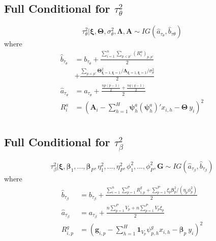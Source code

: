 \documentclass[
]{article}
\begin{document}
\subsection{\texorpdfstring{Full Conditional for \(\tau^2_\theta\)}{Full Conditional for \textbackslash tau\^{}2\_\textbackslash theta}}\label{full-conditional-for-tau2_theta}

\[ \tau^2_\theta| {\boldsymbol \xi} , {\boldsymbol \Theta} , \sigma_{\theta}^2,  {\boldsymbol \Lambda} ,  {\boldsymbol A} \sim IG(\hat{a}_{\tau_\theta}, \hat{b}_{\tau\theta}) \]
where
\begin{align*}
    \hat{b}_{\tau_\theta} & = b_{\tau_\theta} + \frac{\sum_{i=1}^n \sum_{p<p'} (R^a_i)_{p,p'}}{2} \\
    &+ \frac{\sum_{p<p'}  {\boldsymbol \Theta} _{ {\boldsymbol \xi} = 1,  {\boldsymbol \xi} = 1}^2 /  {\boldsymbol \Lambda} _{ {\boldsymbol \xi} = 1,  {\boldsymbol \xi} = 1} / \sigma^2_{\theta}}{2}  \\ 
    \hat{a}_{\tau_\theta} & = a_{\tau_\theta} + \frac{\frac{np(p-1)}{2} + \frac{nq(q-1)}{2}}{2} \\
    R_i^a                 &=  \left(  {\boldsymbol A} _i - \sum_{h=1}^{H}  {\boldsymbol \psi} _{h}^a ( {\boldsymbol \psi} _{h}^{a})' x_{i,h} -  {\boldsymbol \Theta} \: y_i \right)^2  \\
\end{align*}

\subsection{\texorpdfstring{Full Conditional for \(\tau^2_\beta\)}{Full Conditional for \textbackslash tau\^{}2\_\textbackslash beta}}\label{full-conditional-for-tau2_beta}

\[ \tau^2_\beta| {\boldsymbol \xi} ,  {\boldsymbol \beta} _1,..., {\boldsymbol \beta} _P, \eta_1^2, ...,\eta_P^2, \phi_1^2, ...,\phi_P^2,  {\boldsymbol G} \sim IG(\hat{a}_{\tau_\beta}, \hat{b}_{\tau_\beta}) \]
where
\begin{align*}
    \hat{b}_{\tau_\beta} &= b_{\tau_\beta} + \frac{\sum_{i=1}^n \sum_{p=1}^P R^g_{i,p} + \sum_{p=1}^P \xi_p  {\boldsymbol \beta} _p^2 / (\eta_p \phi^2_p)}{2} \\ 
    \hat{a}_{\tau_\beta} &= a_{\tau_\beta} + \frac{n \sum_{p=1}^P V_p + n \sum_{p=1}^P V_p \xi_p}{2} \\
    R_{i,p}^g            &=  \left(  {\boldsymbol g} _{i,p} - \sum_{h=1}^{H} {\boldsymbol 1}_{V_p}\psi_{p,h}^g x_{i,h} -  {\boldsymbol \beta} _{p}\: y_i \right)^2
\end{align*}
\end{document}
